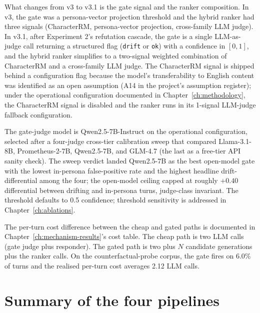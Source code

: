 What changes from v3 to v3.1 is the gate signal and the ranker composition. In v3, the gate was a persona-vector projection threshold and the hybrid ranker had three signals (CharacterRM, persona-vector projection, cross-family LLM judge). In v3.1, after Experiment 2's refutation cascade, the gate is a single LLM-as-judge call returning a structured flag (\texttt{drift} or \texttt{ok}) with a confidence in $[0, 1]$, and the hybrid ranker simplifies to a two-signal weighted combination of CharacterRM\autocite{charactereval2024} and a cross-family LLM judge. The CharacterRM signal is shipped behind a configuration flag because the model's transferability to English content was identified as an open assumption (A14 in the project's assumption register); under the operational configuration documented in Chapter~\ref{ch:methodology}, the CharacterRM signal is disabled and the ranker runs in its 1-signal LLM-judge fallback configuration.

The gate-judge model is Qwen2.5-7B-Instruct on the operational configuration, selected after a four-judge cross-tier calibration sweep that compared Llama-3.1-8B, Prometheus-2-7B, Qwen2.5-7B, and GLM-4.7 (the last as a free-tier API sanity check). The sweep verdict landed Qwen2.5-7B as the best open-model gate with the lowest in-persona false-positive rate and the highest headline drift-differential among the four; the open-model ceiling capped at roughly $+0.40$ differential between drifting and in-persona turns, judge-class invariant\autocite{poll2024, prometheus2024}. The threshold defaults to 0.5 confidence; threshold sensitivity is addressed in Chapter~\ref{ch:ablations}.

The per-turn cost difference between the cheap and gated paths is documented in Chapter~\ref{ch:mechanism-results}'s cost table. The cheap path is two LLM calls (gate judge plus responder). The gated path is two plus $N$ candidate generations plus the ranker calls. On the counterfactual-probe corpus, the gate fires on 6.0\% of turns and the realised per-turn cost averages 2.12 LLM calls.

\section{Summary of the four pipelines}

